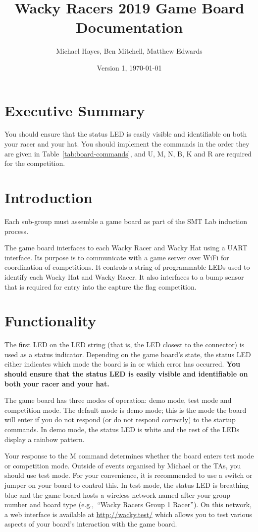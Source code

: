 \documentclass[11pt, a4paper]{article}
\title{Wacky Racers 2019 Game Board Documentation}
\author{Michael Hayes, Ben Mitchell, Matthew Edwards}
\date{Version 1, \today}
\begin{document}
\maketitle

\section{Executive Summary}
You should ensure that the status LED is easily visible and identifiable on both your racer and your hat.
You should implement the commands in the order they are given in Table~\ref{tab:board-commands}, and U, M, N, B, K and R are required for the competition.


\section{Introduction}
Each sub-group must assemble a game board as part of the SMT Lab induction process.

The game board interfaces to each Wacky Racer and Wacky Hat using a UART interface.
Its purpose is to communicate with a game server over WiFi for coordination of competitions.
It controls a string of programmable LEDs used to identify each Wacky Hat and Wacky Racer.
It also interfaces to a bump sensor that is required for entry into the capture the flag competition.

\section{Functionality}
The first LED on the LED string (that is, the LED closest to the connector) is used as a status indicator.
Depending on the game board's state, the status LED either indicates which mode the board is in or which error has occurred.
\textbf{You should ensure that the status LED is easily visible and identifiable on both your racer and your hat.}

The game board has three modes of operation: demo mode, test mode and competition mode.
The default mode is demo mode; this is the mode the board will enter if you do not respond (or do not respond correctly) to the startup commands.
In demo mode, the status LED is white and the rest of the LEDs display a rainbow pattern.

Your response to the M command determines whether the board enters test mode or competition mode.
Outside of events organised by Michael or the TAs, you should use test mode.
For your convenience, it is recommended to use a switch or jumper on your board to control this.
In test mode, the status LED is breathing blue and the game board hosts a wireless network named after your group number and board type (e.g.,~``Wacky Racers Group 1 Racer'').
On this network, a web interface is available at \url{http://wacky.test/} which allows you to test various aspects of your board's interaction with the game board.
\end{document}
